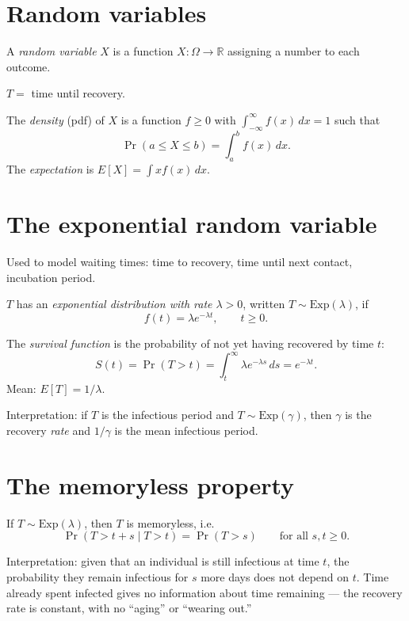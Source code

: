\section{Random variables}

\begin{definition}
A \emph{random variable} $X$ is a function $X:\Omega\to\mathbb{R}$ assigning a number to each outcome.
\end{definition}

\begin{example}
$T=$ time until recovery.
\end{example}

\begin{definition}
The \emph{density} (pdf) of $X$ is a function $f\ge 0$ with $\displaystyle\int_{-\infty}^\infty f(x)\,dx=1$ such that
\[
\Pr(a\le X\le b)=\int_a^b f(x)\,dx.
\]
The \emph{expectation} is $E[X]=\int x f(x)\,dx$.
\end{definition}

\section{The exponential random variable}

Used to model waiting times: time to recovery, time until next contact, incubation period.

\begin{definition}
$T$ has an \emph{exponential distribution with rate $\lambda>0$}, written $T\sim\text{Exp}(\lambda)$, if
\[
f(t)=\lambda e^{-\lambda t}, \qquad t\ge 0.
\]
\end{definition}

The \emph{survival function} is the probability of not yet having recovered by time $t$:
\[
S(t) = \Pr(T>t) = \int_t^\infty \lambda e^{-\lambda s}\,ds = e^{-\lambda t}.
\]
Mean: $E[T]=1/\lambda$.

Interpretation: if $T$ is the infectious period and $T\sim\text{Exp}(\gamma)$, then $\gamma$ is the recovery \emph{rate} and $1/\gamma$ is the mean infectious period.

\section{The memoryless property}


\begin{proposition}
  If $T\sim\text{Exp}(\lambda)$, then $T$ is memoryless, i.e.~
  \[
  \Pr(T> t+s \mid T> t) = \Pr(T> s) \qquad \text{for all } s,t\ge 0.
  \]
\end{proposition}
Interpretation: given that an individual is still infectious at time
$t$, the probability they remain infectious for $s$ more days does not
depend on $t$. Time already spent infected gives no information about
time remaining --- the recovery rate is constant, with no ``aging'' or
``wearing out.''

